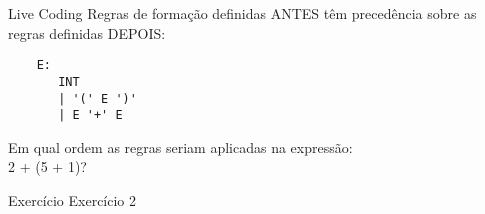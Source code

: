 \documentclass{beamer}
\begin{document}
\begin{frame}[fragile]{Live Coding}
  \large
  Regras de formação definidas ANTES têm precedência sobre as regras definidas
  DEPOIS:
  \begin{verbatim}
    E:
       INT
       | '(' E ')'
       | E '+' E
  \end{verbatim}
  Em qual ordem as regras seriam aplicadas na expressão: \\ \textsc{2 + (5 + 1)}?
\end{frame}

\begin{frame}{Exercício}
\large
  Exercício 2
\end{frame}
\end{document}
